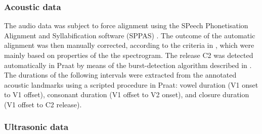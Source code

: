 \documentclass[]{JASAnew}
\begin{document}
\hypertarget{acoustic-data}{%
\subsubsection{Acoustic data}\label{acoustic-data}}

The audio data was subject to force alignment using the SPeech
Phonetisation Alignment and Syllabification software (SPPAS)
\citep{bigi2015}. The outcome of the automatic alignment was then
manually corrected, according to the criteria in ,
which were mainly based on properties of the the spectrogram. The
release C2 was detected automatically in Praat \citep{boersma2016} by
means of the burst-detection algorithm described in
\citet{ananthapadmanabha2014}. The durations of the following intervals
were extracted from the annotated acoustic landmarks using a scripted
procedure in Praat: vowel duration (V1 onset to V1 offset), consonant
duration (V1 offset to V2 onset), and closure duration (V1 offset to C2
release).


\hypertarget{ultrasonic-data}{%
\subsubsection{Ultrasonic data}\label{ultrasonic-data}}
\end{document}
